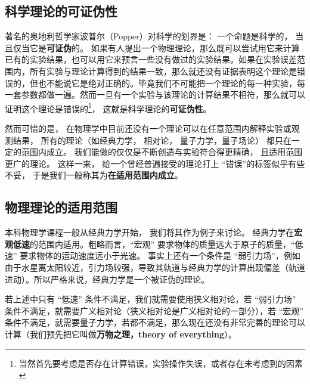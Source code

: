 

\subsection{科学理论的可证伪性}

著名的奥地利哲学家波普尔（Popper）对科学的划界是： 一个命题是科学的， 当且仅当它是\textbf{可证伪}的。 如果有人提出一个物理理论，那么既可以尝试用它来计算已有的实验结果，也可以用它来预言一些没有做过的实验结果。如果在实验误差范围内，所有实验与理论计算得到的结果一致，那么就还没有证据表明这个理论是错误的，但也不能说它是绝对正确的。毕竟我们不可能把一个理论的每一种实验，每一套参数都做一遍。然而一旦有一个实验与该理论的计算结果不相符，那么就可以证明这个理论是错误的\footnote{当然首先要考虑是否存在计算错误，实验操作失误，或者存在未考虑到的因素}， 这就是科学理论的\textbf{可证伪性}。

然而可惜的是， 在物理学中目前还没有一个理论可以在任意范围内解释实验或观测结果， 所有的理论（如经典力学， 相对论， 量子力学，量子场论） 都只在一定的范围内成立。 我们能做的仅仅是不断创造与实验符合得更精确， 且适用范围更广的理论。 这样一来， 给一个曾经普遍接受的理论打上 “错误”的标签似乎有些不妥， 于是我们一般称其为\textbf{在适用范围内成立}。

\subsection{物理理论的适用范围}
本科物理学课程一般从经典力学开始， 我们将其作为例子来讨论。 经典力学在\textbf{宏观低速}的范围内适用。粗略而言，“宏观” 要求物体的质量远大于原子的质量，“低速” 要求物体的运动速度远小于光速。 事实上还有一个条件是 “弱引力场”，例如由于水星离太阳较近，引力场较强，导致其轨道与经典力学的计算出现偏差（轨道进动）。所以严格来说，经典力学是一个被证伪的理论。

若上述中只有 “低速” 条件不满足，我们就需要使用狭义相对论，若 “弱引力场” 条件不满足，就需要广义相对论（狭义相对论是广义相对论的一部分），若 “宏观” 条件不满足，就需要量子力学，若都不满足，那么现在还没有非常完善的理论可以计算（我们预先把它叫做\textbf{万物之理，theory of everything}）。

